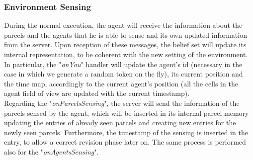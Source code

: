         \subsubsection{Environment Sensing}
            During the normal execution, the agent will receive the information about the parcels and the agents that he is able to sense and its own updated information from the server. Upon reception of these messages, the belief set will update its internal representation, to be coherent with the new setting of the environment.  In particular, the "\textit{onYou}" handler will update the agent's id (necessary in the case in which we generate a random token on the fly), its current position and the time map, accordingly to the current agent's position (all the cells in the agent field of view are updated with the current timestamp).
            \medskip\\
            Regarding the "\textit{onParcelsSensing}", the server will send the information of the parcels sensed by the agent, which will be inserted in its internal parcel memory updating the entries of already seen parcels and creating new entries for the newly seen parcels. Furthermore, the timestamp of the sensing is inserted in the entry, to allow a correct revision phase later on. The same process is performed also for the "\textit{onAgentsSensing}".

